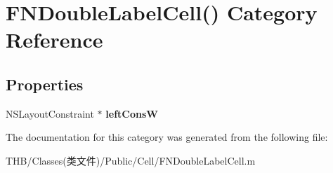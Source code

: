 \hypertarget{category_f_n_double_label_cell_07_08}{}\section{F\+N\+Double\+Label\+Cell() Category Reference}
\label{category_f_n_double_label_cell_07_08}
\subsection*{Properties}
\begin{DoxyCompactItemize}
\item 
\mbox{\label{category_f_n_double_label_cell_07_08_a7a0c7d3be57ed53ecb43995d4a983232}} 
N\+S\+Layout\+Constraint $\ast$ {\bfseries left\+ConsW}
\end{DoxyCompactItemize}


The documentation for this category was generated from the following file\+:\begin{DoxyCompactItemize}
\item 
T\+H\+B/\+Classes(类文件)/\+Public/\+Cell/F\+N\+Double\+Label\+Cell.\+m\end{DoxyCompactItemize}

